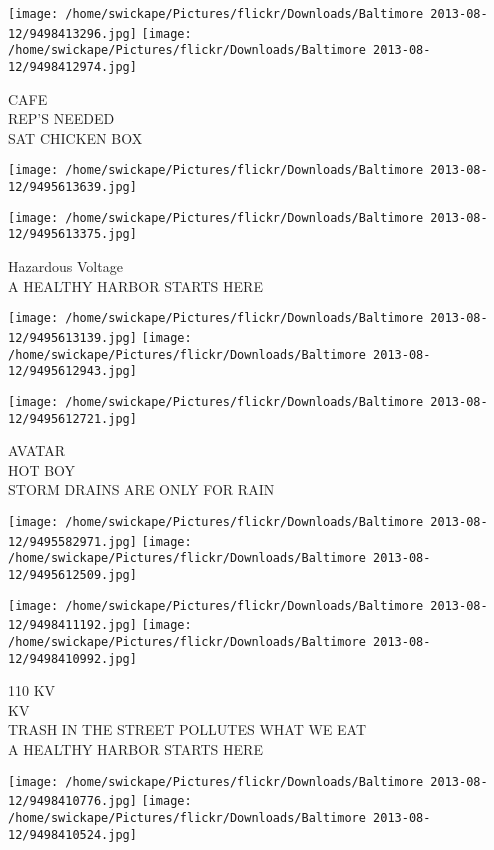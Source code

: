 \documentclass[10pt,letterpaper]{article}
\begin{document}
\vspace{0.25in}
\texttt{[image: /home/swickape/Pictures/flickr/Downloads/Baltimore 2013-08-12/9498413296.jpg]}
\texttt{[image: /home/swickape/Pictures/flickr/Downloads/Baltimore 2013-08-12/9498412974.jpg]}

CAFE\\
REP'S NEEDED\\
SAT CHICKEN BOX
\pagebreak

\texttt{[image: /home/swickape/Pictures/flickr/Downloads/Baltimore 2013-08-12/9495613639.jpg]}

\vspace{0.25in}
\texttt{[image: /home/swickape/Pictures/flickr/Downloads/Baltimore 2013-08-12/9495613375.jpg]}

Hazardous Voltage\\
A HEALTHY HARBOR STARTS HERE
\pagebreak

\texttt{[image: /home/swickape/Pictures/flickr/Downloads/Baltimore 2013-08-12/9495613139.jpg]}
\texttt{[image: /home/swickape/Pictures/flickr/Downloads/Baltimore 2013-08-12/9495612943.jpg]}

\vspace{0.25in}
\texttt{[image: /home/swickape/Pictures/flickr/Downloads/Baltimore 2013-08-12/9495612721.jpg]}

AVATAR\\
HOT BOY\\
STORM DRAINS ARE ONLY FOR RAIN
\pagebreak

\texttt{[image: /home/swickape/Pictures/flickr/Downloads/Baltimore 2013-08-12/9495582971.jpg]}
\texttt{[image: /home/swickape/Pictures/flickr/Downloads/Baltimore 2013-08-12/9495612509.jpg]}

\texttt{[image: /home/swickape/Pictures/flickr/Downloads/Baltimore 2013-08-12/9498411192.jpg]}
\texttt{[image: /home/swickape/Pictures/flickr/Downloads/Baltimore 2013-08-12/9498410992.jpg]}

110 KV\\
KV\\
TRASH IN THE STREET POLLUTES WHAT WE EAT\\
A HEALTHY HARBOR STARTS HERE
\pagebreak

\texttt{[image: /home/swickape/Pictures/flickr/Downloads/Baltimore 2013-08-12/9498410776.jpg]}
\texttt{[image: /home/swickape/Pictures/flickr/Downloads/Baltimore 2013-08-12/9498410524.jpg]}
\end{document}
